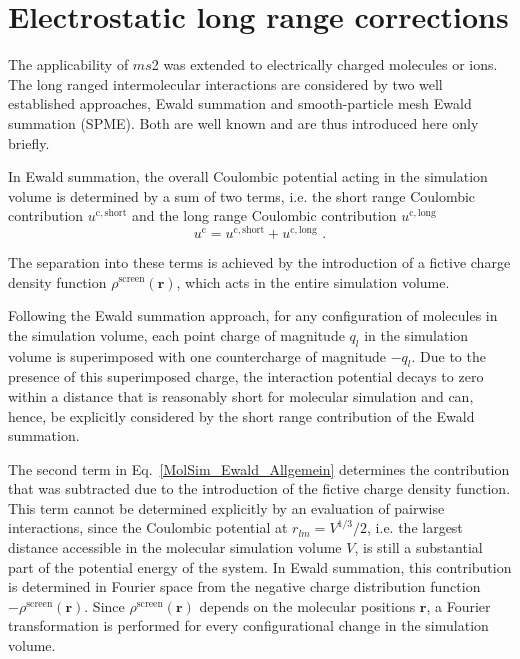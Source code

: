 \documentclass[preprint,12pt]{elsarticle}
\begin{document}
\section{Electrostatic long range corrections}
\label{sec:ewald}

The applicability of $ms$2 was extended to electrically charged molecules or ions. The long ranged intermolecular interactions are considered by two well established approaches, Ewald summation and smooth-particle mesh Ewald summation (SPME). Both are well known \cite{fre02} and are thus introduced here only briefly. 

In Ewald summation, the overall Coulombic potential acting in the simulation volume is determined by a sum of two terms, i.e. the short range Coulombic contribution $u^{\mathrm{c, short}}$ and the long range Coulombic contribution $u^{\mathrm{c, long}}$ 
\begin{equation}
 u^{\mathrm{c}} = u^{\mathrm{c, short}} + u^{\mathrm{c, long}}  \mbox{   .}
\label{MolSim_Ewald_Allgemein}
\end{equation}

The separation into these terms is achieved by the introduction of a fictive charge density function $\rho^{\mathrm{screen}}(\bm{r})$, which acts in the entire simulation volume. 

Following the Ewald summation approach, for any configuration of molecules in the simulation volume, each point charge of magnitude $q_l$ in the simulation volume is superimposed with one countercharge of magnitude $-q_l$. Due to  the presence of this superimposed charge, the interaction potential decays to zero within a distance that is reasonably short for molecular simulation and can, hence, be explicitly considered by the short range contribution of the Ewald summation. 

The second term in Eq.~\eqref{MolSim_Ewald_Allgemein} determines the contribution that was subtracted due to the introduction of the fictive charge density function. This term cannot be determined explicitly by an evaluation of pairwise interactions, since the Coulombic potential at $r_{lm}=V^{1/3}/2$, i.e. the largest distance accessible in the molecular simulation volume $V$, is still a substantial part of the potential energy of the system. In Ewald summation, this contribution is determined in Fourier space from the negative charge distribution function $-\rho^{\mathrm{screen}}(\bm{r})$. Since $\rho^{\mathrm{screen}}(\bm{r})$ depends on the molecular positions $\boldsymbol{r}$, a Fourier transformation is performed for every configurational change in the simulation volume. 
\end{document}
